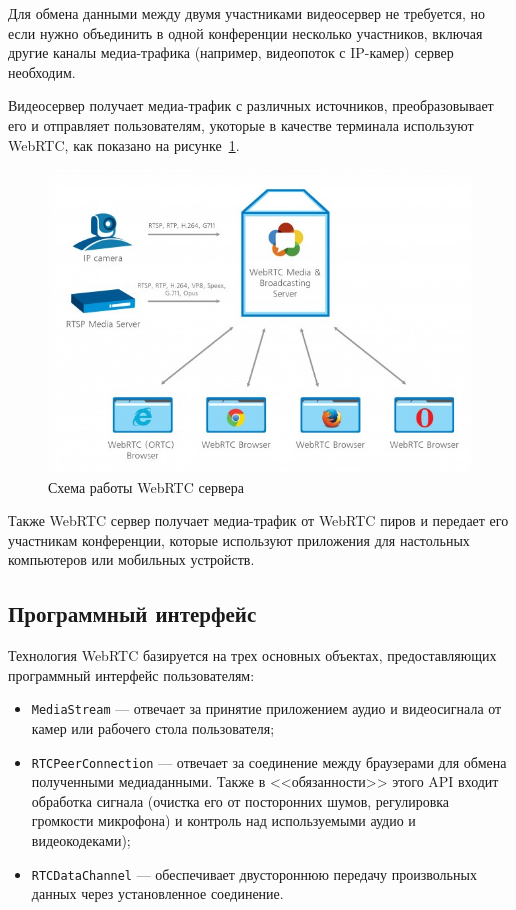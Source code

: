 Для обмена данными между двумя участниками видеосервер не требуется,
но если нужно объединить в одной конференции несколько участников, 
включая другие каналы медиа-трафика (например, видеопоток с IP-камер) сервер необходим.

Видеосервер получает медиа-трафик с различных источников, 
преобразовывает его и отправляет пользователям, 
укоторые в качестве терминала используют WebRTC, 
как показано на рисунке~\ref{pic:webrtc_server}.

\begin{figure}[h!]
  \centering
  \includegraphics[width=150mm]{pic/webrtc_server.png}
  \caption{Схема работы WebRTC сервера}
  \label{pic:webrtc_server}
\end{figure}

Также WebRTC сервер получает медиа-трафик от WebRTC пиров и передает его
участникам конференции, которые используют приложения для настольных компьютеров 
или мобильных устройств.

\subsection{Программный интерфейс}
\label{ssec:webrtc_api}

Технология WebRTC базируется на трех основных объектах,
предоставляющих программный интерфейс пользователям:

\begin{itemize}
\item \texttt{MediaStream} --- отвечает за принятие приложением аудио и видеосигнала
  от камер или рабочего стола пользователя;
\item \texttt{RTCPeerConnection} --- отвечает за соединение между браузерами для
  обмена полученными медиаданными. 
  Также в <<обязанности>> этого API входит обработка сигнала 
  (очистка его от посторонних шумов, регулировка громкости микрофона) и
  контроль над используемыми аудио и видеокодеками);
\item \texttt{RTCDataChannel} --- обеспечивает двустороннюю передачу произвольных
  данных через установленное соединение.
\end{itemize}

